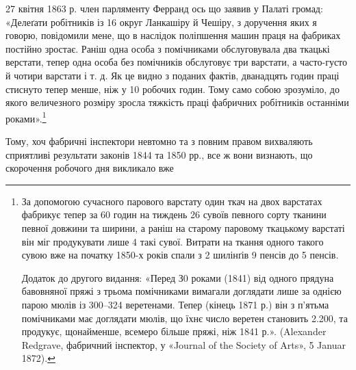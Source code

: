 27 квітня 1863 р. член парляменту Ферранд ось що заявив у
Палаті громад: «Делеґати робітників із 16 округ Ланкашіру й
Чешіру, з доручення яких я говорю, повідомили мене, що в наслідок
поліпшення машин праця на фабриках постійно зростає.
Раніш одна особа з помічниками обслуговувала два ткацькі верстати,
тепер одна особа без помічників обслуговує три варстати,
а часто-густо й чотири варстати і т. д. Як це видно з поданих
фактів, дванадцять годин праці стиснуто тепер менше, ніж у
10 робочих годин. Тому само собою зрозуміло, до якого величезного
розміру зросла тяжкість праці фабричних робітників останніми
роками».\footnote{
За допомогою сучасного парового варстату один ткач на двох
варстатах фабрикує тепер за 60 годин на тиждень 26 сувоїв певного сорту
тканини певної довжини та ширини, а раніш на старому паровому ткацькому
варстаті він міг продукувати лише 4 такі сувої. Витрати на ткання
одного такого сувою вже на початку 1850-х років спали з 2 шилінґів
9 пенсів до 5 пенсів.

Додаток до другого видання: «Перед З0 роками (1841) від одного прядуна
бавовняної пряжі з трьома помічниками вимагали доглядати лише
за однією парою мюлів із 300--324 веретенами. Тепер (кінець 1871 р.)
він з п’ятьма помічниками має доглядати мюлів, що їхнє число веретен
становить 2.200, та продукує, щонайменше, всемеро більше пряжі, ніж
1841 р.». (Alexander Redgrave, фабричний інспектор, у «Journal of
the Society of Arts», 5 Januar 1872).
}

Тому, хоч фабричні інспектори невтомно та з повним правом
вихваляють сприятливі результати законів 1844 та 1850 рр.,
все ж вони визнають, що скорочення робочого дня викликало вже
\parbreak{}  %
